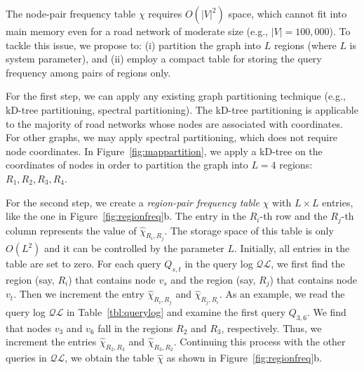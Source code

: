\documentclass{sig-alternate}
\newcommand{\stitle}[1]{\vspace*{0.4em}\noindent{\bf #1:\/}}
\begin{document}






\stitle{Region-pair frequency counting}
%
The node-pair frequency table $\chi$ requires $O(|V|^2)$ space,
which cannot fit into main memory even for a road network of moderate size (e.g., $|V|=100,000$).
To tackle this issue, we propose to: (i) partition the graph into $L$ regions (where $L$ is system parameter),
and (ii) employ a compact table for storing the query frequency among pairs of regions only.


For the first step, we can apply any existing graph partitioning technique (e.g., kD-tree partitioning, spectral partitioning).
The kD-tree partitioning is applicable to the majority of road networks whose nodes are associated with coordinates.
For other graphs, we may apply spectral partitioning, which does not require node coordinates.
In Figure~\ref{fig:mappartition}, we apply a kD-tree on the coordinates of nodes
in order to partition the graph into $L=4$ regions: $R_1, R_2, R_3, R_4$.




For the second step, we create a {\em region-pair frequency table} $\widehat{\chi}$ with $L \times L$ entries,
like the one in Figure~\ref{fig:regionfreq}b.
The entry in the $R_i$-th row and the $R_j$-th column represents the value of $\widehat{\chi}_{R_i,R_j}$.
The storage space of this table is only $O(L^2)$ and it can be controlled by the parameter $L$.
Initially, all entries in the table are set to zero.
For each query $Q_{s,t}$ in the query log $\mathcal{QL}$,
we first find the region (say, $R_i$) that contains node $v_s$ and
the region (say, $R_j$) that contains node $v_t$.
Then we increment the entry $\widehat{\chi}_{R_i,R_j}$ and $\widehat{\chi}_{R_j,R_i}$.
As an example, we read the query log $\mathcal{QL}$ in Table~\ref{tbl:querylog}
and examine the first query $Q_{3,6}$.
We find that nodes $v_3$ and $v_6$ fall in the regions $R_2$ and $R_3$, respectively.
Thus, we increment the entries $\widehat{\chi}_{R_2,R_3}$ and $\widehat{\chi}_{R_3,R_2}$.
Continuing this process with the other queries in $\mathcal{QL}$,
we obtain the table $\widehat{\chi}$ as shown in Figure~\ref{fig:regionfreq}b.
\end{document}
